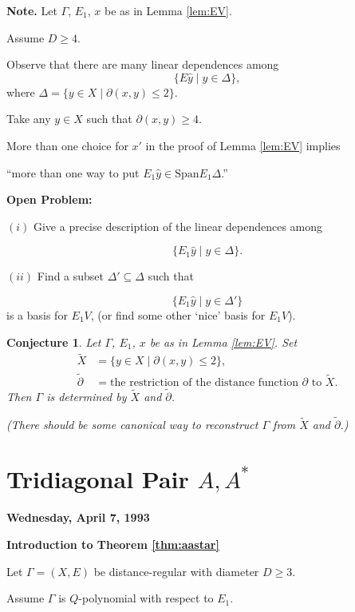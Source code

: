\documentclass[
]{book}
\newtheorem{conjecture}{Conjecture}[chapter]
\theoremstyle{definition}
\theoremstyle{definition}
\theoremstyle{definition}
\theoremstyle{definition}
\theoremstyle{remark}
\begin{document}
\textbf{Note.}
Let \(\Gamma\), \(E_1\), \(x\) be as in Lemma \ref{lem:EV}.

Assume \(D\geq 4\).

Observe that there are many linear dependences among
\[\{E\hat{y}\mid y\in \Delta\},\]
where \(\Delta = \{y\in X\mid \partial(x,y)\leq 2\}\).

Take any \(y\in X\) such that \(\partial(x,y)\geq 4\).

More than one choice for \(x'\) in the proof of Lemma \ref{lem:EV} implies

``more than one way to put \(E_1\hat{y}\in \mathrm{Span} E_1\Delta\).''

\textbf{Open Problem:}

\((i)\) Give a precise description of the linear dependences among

\[\{E_1\hat{y}\mid y\in \Delta\}.\]

\((ii)\) Find a subset \(\Delta'\subseteq \Delta\) such that

\[\{E_1\hat{y}\mid y\in \Delta'\}\]
is a basis for \(E_1V\), (or find some other `nice' basis for \(E_1V\)).

\begin{conjecture}
\protect\hypertarget{cnj:EV}{}\label{cnj:EV}Let \(\Gamma\), \(E_1\), \(x\) be as in Lemma \ref{lem:EV}. Set
\begin{align}
\widetilde{X} & = \{y\in X\mid \partial(x,y)\leq 2\},\\
\tilde{\partial} & = \text{the restriction of the distance function $\partial$ to $\widetilde{X}$}.
\end{align}
Then \(\Gamma\) is determined by \(\widetilde{X}\) and \(\tilde{\partial}\).

(There should be some canonical way to reconstruct \(\Gamma\) from \(\widetilde{X}\) and \(\tilde{\partial}\).)
\end{conjecture}

\hypertarget{lec29}{%
\chapter{\texorpdfstring{Tridiagonal Pair \(A, A^*\)}{Tridiagonal Pair A, A\^{}*}}\label{lec29}}

\textbf{Wednesday, April 7, 1993}

\textbf{Introduction to Theorem \ref{thm:aastar}}

Let \(\Gamma = (X,E)\) be distance-regular with diameter \(D\geq 3\).

Assume \(\Gamma\) is \(Q\)-polynomial with respect to \(E_1\).
\end{document}
